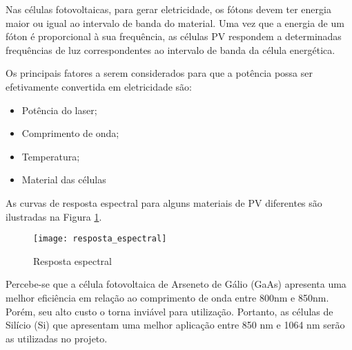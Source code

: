 Nas células fotovoltaicas, para gerar eletricidade, os fótons devem ter energia maior ou igual ao intervalo de banda do material. Uma vez que a energia de um fóton é proporcional à sua frequência, as células PV respondem a determinadas frequências de luz correspondentes ao intervalo de banda da célula energética.

Os principais fatores a serem considerados para que a potência possa ser efetivamente convertida em eletricidade são:

\begin{itemize}
	\item Potência do laser;
	\item Comprimento de onda;
	\item Temperatura;
	\item Material das células
\end{itemize}

As curvas de resposta espectral para alguns materiais de PV diferentes são ilustradas na Figura \ref{fig:resposta_espectral}.

\begin{figure}[ht!]
\centering
\caption{Resposta espectral}
\label{fig:resposta_espectral}
\texttt{[image: resposta\_espectral]}
\end{figure}

Percebe-se que a célula fotovoltaica de Arseneto de Gálio (GaAs) apresenta uma melhor eficiência em relação ao comprimento de onda entre 800nm e 850nm. Porém, seu alto custo o torna inviável para utilização. Portanto, as células de Silício (Si) que apresentam uma melhor aplicação entre 850 nm e 1064 nm serão as utilizadas no projeto.